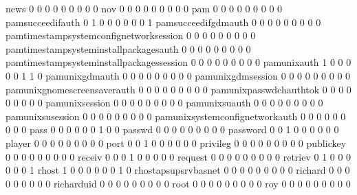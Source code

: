 \documentclass[compress,8pt]{beamer}
\begin{document}
\begin{frame}
\begin{Schunk}
  news                                       0   0   0   0   0   0   0   0   0
  nov                                        0   0   0   0   0   0   0   0   0
  pam                                        0   0   0   0   0   0   0   0   0
  pamsucceedifauth                           0   1   0   0   0   0   0   0   1
  pamsucceedifgdmauth                        0   0   0   0   0   0   0   0   0
  pamtimestampsystemconfignetworksession     0   0   0   0   0   0   0   0   0
  pamtimestampsysteminstallpackagesauth      0   0   0   0   0   0   0   0   0
  pamtimestampsysteminstallpackagessession   0   0   0   0   0   0   0   0   0
  pamunixauth                                1   0   0   0   0   0   1   1   0
  pamunixgdmauth                             0   0   0   0   0   0   0   0   0
  pamunixgdmsession                          0   0   0   0   0   0   0   0   0
  pamunixgnomescreensaverauth                0   0   0   0   0   0   0   0   0
  pamunixpasswdchauthtok                     0   0   0   0   0   0   0   0   0
  pamunixsession                             0   0   0   0   0   0   0   0   0
  pamunixsuauth                              0   0   0   0   0   0   0   0   0
  pamunixsusession                           0   0   0   0   0   0   0   0   0
  pamunixsystemconfignetworkauth             0   0   0   0   0   0   0   0   0
  pass                                       0   0   0   0   0   0   1   0   0
  passwd                                     0   0   0   0   0   0   0   0   0
  password                                   0   0   1   0   0   0   0   0   0
  player                                     0   0   0   0   0   0   0   0   0
  port                                       0   0   1   0   0   0   0   0   0
  privileg                                   0   0   0   0   0   0   0   0   0
  publickey                                  0   0   0   0   0   0   0   0   0
  receiv                                     0   0   0   1   0   0   0   0   0
  request                                    0   0   0   0   0   0   0   0   0
  retriev                                    0   1   0   0   0   0   0   0   1
  rhost                                      1   0   0   0   0   0   0   1   0
  rhostapsupsrvbasnet                        0   0   0   0   0   0   0   0   0
  richard                                    0   0   0   0   0   0   0   0   0
  richarduid                                 0   0   0   0   0   0   0   0   0
  root                                       0   0   0   0   0   0   0   0   0
  roy                                        0   0   0   0   0   0   0   0   0

\end{Schunk}
\end{frame}
\end{document}
